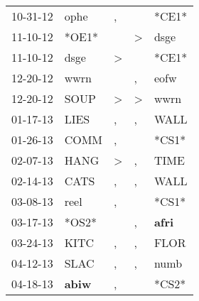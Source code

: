 \begin{supertabular}{p{0.07\textwidth}p{0.06\textwidth}p{0.02\textwidth}p{0.02\textwidth}p{0.06\textwidth}}
          10-31-12\textsuperscript{} &           ophe\textsuperscript{} &                , &                  &                            *CE1* \\
          11-10-12\textsuperscript{} &                            *OE1* &                  &     \textgreater &           dsge\textsuperscript{} \\
          11-10-12\textsuperscript{} &           dsge\textsuperscript{} &     \textgreater &                  &                            *CE1* \\
          12-20-12\textsuperscript{} &           wwrn\textsuperscript{} &                  &                , &           eofw\textsuperscript{} \\
          12-20-12\textsuperscript{} &           SOUP\textsuperscript{} &     \textgreater &     \textgreater &           wwrn\textsuperscript{} \\
          01-17-13\textsuperscript{} &           LIES\textsuperscript{} &                , &                , &           WALL\textsuperscript{} \\
          01-26-13\textsuperscript{} &           COMM\textsuperscript{} &                , &                  &                            *CS1* \\
          02-07-13\textsuperscript{} &           HANG\textsuperscript{} &     \textgreater &                , &           TIME\textsuperscript{} \\
          02-14-13\textsuperscript{} &           CATS\textsuperscript{} &                , &                , &           WALL\textsuperscript{} \\
          03-08-13\textsuperscript{} &           reel\textsuperscript{} &                , &                  &                            *CS1* \\
          03-17-13\textsuperscript{} &                            *OS2* &                  &                , &  \textbf{afri\textsuperscript{}} \\
          03-24-13\textsuperscript{} &           KITC\textsuperscript{} &                , &                , &           FLOR\textsuperscript{} \\
          04-12-13\textsuperscript{} &           SLAC\textsuperscript{} &                , &                , &           numb\textsuperscript{} \\
          04-18-13\textsuperscript{} &  \textbf{abiw\textsuperscript{}} &                , &                  &                            *CS2* \\

\end{supertabular}

